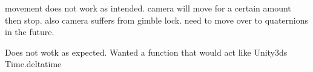 
\begin{DoxyRefList}
\item[\label{bug__bug000001}%
\hypertarget{bug__bug000001}{}%
Member \hyperlink{class_camera_a6ca725d7a02cc423d220a849140fc0aa}{Camera\+:\+:handle\+Movement} (S\+D\+L\+\_\+\+Event $\ast$e)]movement does not work as intended. camera will move for a certain amount then stop. also camera suffers from gimble lock. need to move over to quaternions in the future.  
\item[\label{bug__bug000002}%
\hypertarget{bug__bug000002}{}%
Member \hyperlink{class_time_a385b4c0869ed969b266535ae835d135d}{Time\+:\+:Delta\+Time} ()]Does not wotk as expected. Wanted a function that would act like Unity3ds Time.\+deltatime 
\end{DoxyRefList}